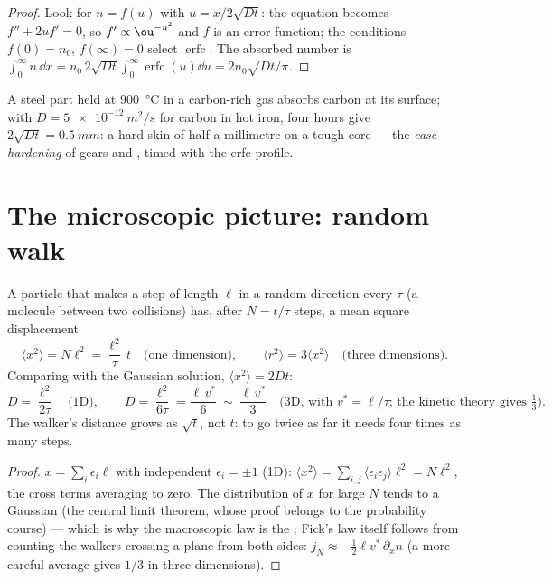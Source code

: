 \begin{proof}
Look for $n = f(u)$ with $u = x/2\sqrt{Dt}$: the equation becomes
$f'' + 2uf' = 0$, so $f' \propto \eu^{-u^2}$ and $f$ is an error
function; the conditions $f(0) = n_0$, $f(\infty) = 0$ select
$\operatorname{erfc}$. The absorbed number is $\int_0^\infty n\,\dd x =
n_0\,2\sqrt{Dt}\int_0^\infty\operatorname{erfc}(u)\dd u = 2n_0\sqrt{Dt/\pi}$.
\end{proof}

\begin{example}\label{ex:b2:particle-diffusion:carburising}
A steel part held at \qty{900}{\celsius} in a carbon-rich gas absorbs
carbon at its surface; with $D = \qty{5e-12}{m^2/s}$ for carbon in hot
iron, four hours give $2\sqrt{Dt} = \qty{0.5}{mm}$: a hard skin of half a
millimetre on a tough core --- the \emph{case hardening} of gears and
, timed with the erfc profile.
\end{example}

\section{The microscopic picture: random walk}\label{sec:b2:particle-diffusion:microscopic}

\begin{proposition}\label{prop:b2:particle-diffusion:walk}
A particle that makes a step of length $\ell$ in a random direction
every $\tau$ (a molecule between two collisions) has, after $N =
t/\tau$ steps, a mean square displacement
\[
\langle x^2\rangle = N\ell^2 = \frac{\ell^2}{\tau}\,t
\quad\text{(one dimension)}, \qquad
\langle r^2\rangle = 3\langle x^2\rangle \quad\text{(three dimensions)}.
\]
Comparing with the Gaussian solution, $\langle x^2\rangle = 2Dt$:
\[
D = \frac{\ell^2}{2\tau} \quad\text{(1D)}, \qquad
D = \frac{\ell^2}{6\tau} = \frac{\ell\,v^*}{6}\ \sim\ \frac{\ell\,v^*}{3}
\quad\text{(3D, with } v^* = \ell/\tau\text{; the kinetic theory gives } \tfrac13) .
\]
The walker's distance grows as $\sqrt t$, not $t$: to go twice as far
it needs four times as many steps.
\end{proposition}

\begin{proof}
$x = \sum_i \epsilon_i\ell$ with independent $\epsilon_i = \pm1$ (1D):
$\langle x^2\rangle = \sum_{i,j}\langle\epsilon_i\epsilon_j\rangle\ell^2 =
N\ell^2$, the cross terms averaging to zero. The distribution of $x$
for large $N$ tends to a Gaussian (the central limit theorem, whose
proof belongs to the probability course) --- which is why the
macroscopic law is the ; Fick's law itself follows
from counting the walkers crossing a plane from both sides: $j_N \approx
-\tfrac12\ell v^*\,\partial_x n$ (a more careful average gives $1/3$ in
three dimensions).
\end{proof}

